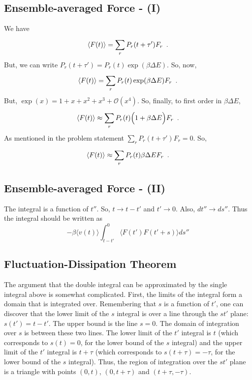 \begin{homeworkProblem}
   \subsection{Ensemble-averaged Force - (I)}
   \label{sub:ensemble_averaged_force_i_}

   We have
   \[
      \langle F(t)  \rangle = \sum^{}_{r} P_{r}(t+\tau') F_{r}\enskip.
   \]
   But, we can write $ P_{r}(t+\tau') = P_{r}(t) \exp(\beta \Delta E) $. So,
   now,
   \[
      \langle F(t)  \rangle = \sum^{}_{r} P_{r}(t) \exp(\beta \Delta E) F_{r}\enskip.
   \]
   But, $ \exp(x) = 1 + x + x^{2} + x^{3} + \mathcal{O}(x^{4}) $. So, finally,
   to first order in $ \beta \Delta E $,
   \[
      \langle F(t)  \rangle \approx \sum^{}_{r} P_{r}(t) \Bigl( 1 + \beta \Delta
      E \Bigr) F_{r}\enskip.
   \]
   As mentioned in the problem statement $ \sum^{}_{r} P_{r}(t+\tau')F_{r} = 0
   $. So,
   \[
      \langle F(t)  \rangle \approx \sum^{}_{r} P_{r}(t) \beta \Delta E
      F_{r}\enskip.
   \]

   \subsection{Ensemble-averaged Force - (II)}
   \label{sub:ensemble_averaged_force_ii_}

   The integral is a function of $ t'' $. So, $ t \to t - t' $ and $ t' \to 0 $.
   Also, $ dt'' \to ds'' $. Thus the integral should be written as
   \[
      -\beta \langle v(t) \rangle \int_{t-t'}^{0} \langle F(t') F(t'+s) \rangle ds''
   \]

   \subsection{Fluctuation-Dissipation Theorem}
   \label{sub:fluctuation_dissipation_theorem}

   The argument that the double integral can be approximated by the single
   integral above is somewhat complicated. First, the limits of the integral
   form a domain that is integrated over. Remembering that $ s $ is a function
   of $ t' $, one can discover that the lower limit of the $ s $ integral is
   over a line through the $ st' $ plane: $ s(t') = t - t' $. The upper bound is
   the line $ s = 0 $. The domain of integration over $ s $ is between these two
   lines. The lower limit of the $ t' $ integral is $ t $ (which corresponds to
   $ s(t) = 0 $, for the lower bound of the $ s $ integral) and the upper limit
   of the $ t' $ integral is $ t+\tau $ (which corresponds to $ s(t+\tau) = -
      \tau $, for the lower bound of the $ s $ integral). Thus, the region of
      integration over the $ st' $ plane is a triangle with points $ (0,t) $, $
      (0,t+\tau)$ and $ (t+\tau,-\tau) $.


\end{homeworkProblem}
